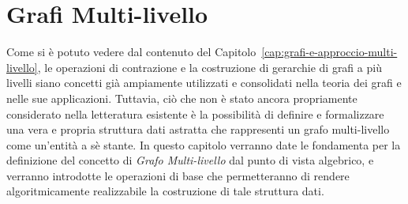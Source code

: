 \chapter{Grafi Multi-livello}\label{cap:grafi-multi-livello}

Come si \`e potuto vedere dal contenuto del Capitolo~\ref{cap:grafi-e-approccio-multi-livello},
le operazioni di contrazione e la costruzione di
gerarchie di grafi a pi\`u livelli siano concetti gi\`a ampiamente utilizzati e consolidati nella teoria dei grafi e
nelle sue applicazioni.
Tuttavia, ci\`o che non \`e stato ancora propriamente considerato nella letteratura esistente \`e la possibilit\`a di
definire e formalizzare una vera e propria struttura dati astratta che rappresenti un grafo multi-livello come
un'entit\`a a s\`e stante.
In questo capitolo verranno date le fondamenta per la definizione del concetto di \textit{Grafo Multi-livello} dal
punto di vista algebrico, e verranno introdotte le operazioni di base che permetteranno di rendere
algoritmicamente realizzabile la costruzione di tale struttura dati.









